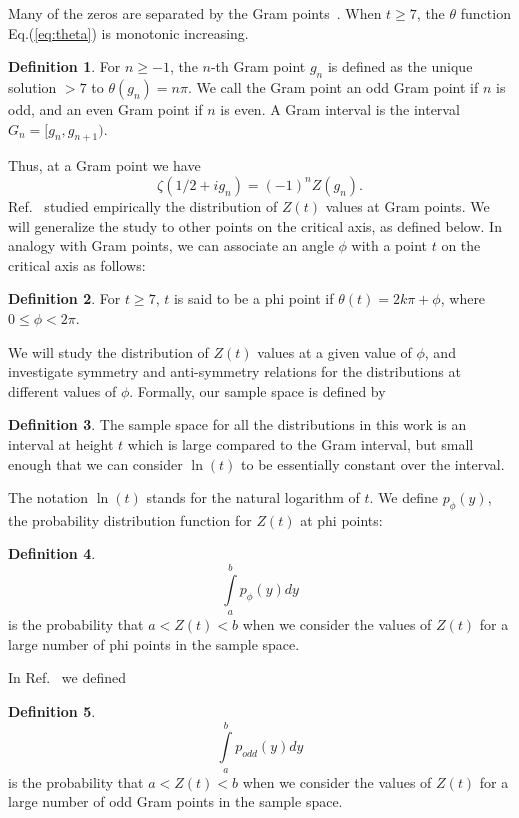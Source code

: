 \documentclass[twoside]{article}
\theoremstyle{definition}
\newtheorem{defn}{Definition}
\begin{document}
Many of the zeros are separated by the
Gram points~\cite{Gram 1903}.  When $t \ge 7$, the $\theta$ function Eq.(\ref{eq:theta}) is monotonic increasing. 
\begin{defn}\label{gram}
For $n \ge -1$, the $n$-th Gram point $g_n$ is defined as the unique solution $> 7$ to
$\theta (g_n) = n\pi$. We call the Gram point an odd Gram point if $n$ is odd, and an even Gram point if $n$ is even.
A Gram interval is the interval $G_n = [g_n,g_{n+1})$.
\end{defn}
Thus, at a Gram point we have
\begin{equation}
\zeta(1/2+ig_n) = (-1)^{n}Z(g_n).
\label{eq:zetagram}
\end{equation}
Ref.~\cite{Shanker 2018} studied empirically the distribution of $Z(t)$ values at Gram points. We will generalize the study to other points on
the critical axis, as defined below. In analogy with Gram points, we can associate an angle $\phi$ with a point $t$ on the critical axis as follows:
\begin{defn}\label{phi}
For $t \ge 7$, $t$ is said to be a phi point if
$\theta (t) = 2k\pi + \phi$, where $0 \le \phi < 2\pi$.
\end{defn}
We will study the distribution of $Z(t)$ values at a given value of $\phi$, and investigate symmetry and anti-symmetry relations for the 
distributions at different values of $\phi$. Formally, our sample space is defined by
\begin{defn}\label{samplespace}The sample space for all the distributions in this work is an interval  at height $t$ which is large compared to the Gram interval, but small enough that we can consider {$\ln (t)$} to be essentially constant over the interval. 
\end{defn}
The notation $\ln (t)$ stands for the natural logarithm of $t$.  We define $p_{\phi}(y)$, the probability distribution function for $Z(t)$ at phi points:
\begin{defn}\label{pphi}
\begin{equation}
\int\limits_{a}^{b} p_{\phi}(y)dy
\label{eq:pdfphi}
\end{equation}
is the probability that $a<Z(t)<b$ when we consider the values of $Z(t)$ for a large number of phi points in the sample space. 
\end{defn}
In Ref.~\cite{Shanker 2018}  we defined
\begin{defn}\label{podd}
\begin{equation}
\int\limits_{a}^{b} p_{odd}(y)dy
\label{eq:pdfodd}
\end{equation}
is the probability that $a<Z(t)<b$ when we consider the values of $Z(t)$ for a large number of odd Gram points in the sample space. 
\end{defn}
\end{document}
